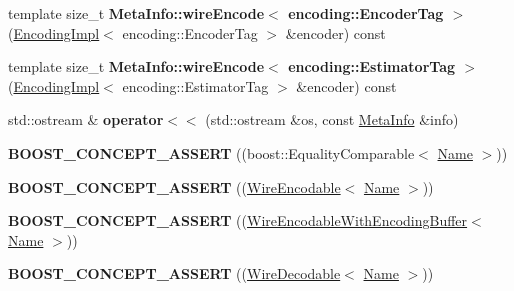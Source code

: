 \begin{DoxyCompactItemize}
\item 
template size\+\_\+t {\bfseries Meta\+Info\+::wire\+Encode$<$ encoding\+::\+Encoder\+Tag $>$} (\hyperlink{classndn_1_1encoding_1_1EncodingImpl}{Encoding\+Impl}$<$ encoding\+::\+Encoder\+Tag $>$ \&encoder) const\hypertarget{namespacendn_abbf2ccabbaeb14f4248d60cbd6a384f6}{}\label{namespacendn_abbf2ccabbaeb14f4248d60cbd6a384f6}

\item 
template size\+\_\+t {\bfseries Meta\+Info\+::wire\+Encode$<$ encoding\+::\+Estimator\+Tag $>$} (\hyperlink{classndn_1_1encoding_1_1EncodingImpl}{Encoding\+Impl}$<$ encoding\+::\+Estimator\+Tag $>$ \&encoder) const\hypertarget{namespacendn_aeaa8f4ac01af0ef090d3ac4be294ed35}{}\label{namespacendn_aeaa8f4ac01af0ef090d3ac4be294ed35}

\item 
std\+::ostream \& {\bfseries operator$<$$<$} (std\+::ostream \&os, const \hyperlink{classndn_1_1MetaInfo}{Meta\+Info} \&info)\hypertarget{namespacendn_a9830b832e03e6aa70e0b7d5b11b09a80}{}\label{namespacendn_a9830b832e03e6aa70e0b7d5b11b09a80}

\item 
{\bfseries B\+O\+O\+S\+T\+\_\+\+C\+O\+N\+C\+E\+P\+T\+\_\+\+A\+S\+S\+E\+RT} ((boost\+::\+Equality\+Comparable$<$ \hyperlink{classndn_1_1Name}{Name} $>$))\hypertarget{namespacendn_a6c059d36806250eb302c8ef6b7c9eb88}{}\label{namespacendn_a6c059d36806250eb302c8ef6b7c9eb88}

\item 
{\bfseries B\+O\+O\+S\+T\+\_\+\+C\+O\+N\+C\+E\+P\+T\+\_\+\+A\+S\+S\+E\+RT} ((\hyperlink{classndn_1_1WireEncodable}{Wire\+Encodable}$<$ \hyperlink{classndn_1_1Name}{Name} $>$))\hypertarget{namespacendn_a4ae61d5ee36b2957a2646dd19c8f2552}{}\label{namespacendn_a4ae61d5ee36b2957a2646dd19c8f2552}

\item 
{\bfseries B\+O\+O\+S\+T\+\_\+\+C\+O\+N\+C\+E\+P\+T\+\_\+\+A\+S\+S\+E\+RT} ((\hyperlink{classndn_1_1WireEncodableWithEncodingBuffer}{Wire\+Encodable\+With\+Encoding\+Buffer}$<$ \hyperlink{classndn_1_1Name}{Name} $>$))\hypertarget{namespacendn_a60200e6a49712cefc7b87c14a566146e}{}\label{namespacendn_a60200e6a49712cefc7b87c14a566146e}

\item 
{\bfseries B\+O\+O\+S\+T\+\_\+\+C\+O\+N\+C\+E\+P\+T\+\_\+\+A\+S\+S\+E\+RT} ((\hyperlink{classndn_1_1WireDecodable}{Wire\+Decodable}$<$ \hyperlink{classndn_1_1Name}{Name} $>$))\hypertarget{namespacendn_ad47ecc841f6324615977aeca6e84fedb}{}\label{namespacendn_ad47ecc841f6324615977aeca6e84fedb}


\end{DoxyCompactItemize}
